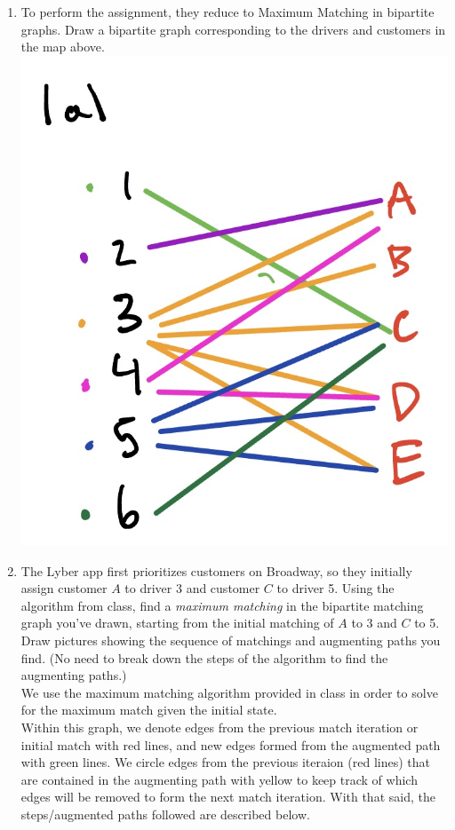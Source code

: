 \documentclass[11pt]{article}
\begin{document}
\begin{enumerate}
    \begin{enumerate}
    \item To perform the assignment, they reduce to Maximum Matching in bipartite graphs.  Draw a bipartite graph corresponding to the drivers and customers in the map above. \\
    
    \includegraphics[width=.75\textwidth]{fall2022/psets/ps6/IMG_0009.jpg}

    
    \item The Lyber app first prioritizes customers on Broadway, so they initially assign customer $A$ to driver 3 and customer $C$ to driver 5. Using the algorithm from class, find a \textit{maximum matching} in the bipartite matching graph you've drawn, starting from the initial matching of $A$ to 3 and $C$ to 5. Draw pictures showing the sequence of matchings and augmenting paths you find. (No need to break down the steps of the algorithm to find the augmenting paths.) \\
    
    We use the maximum matching algorithm provided in class in order to solve for the maximum match given the initial state. \\
    
    Within this graph, we denote edges from the previous match iteration or initial match with red lines, and new edges formed from the augmented path with green lines. We circle edges from the previous iteraion (red lines) that are contained in the augmenting path with yellow to keep track of which edges will be removed to form the next match iteration. With that said, the steps/augmented paths followed are described below. \\
    

\end{enumerate}
\end{enumerate}
\end{document}
